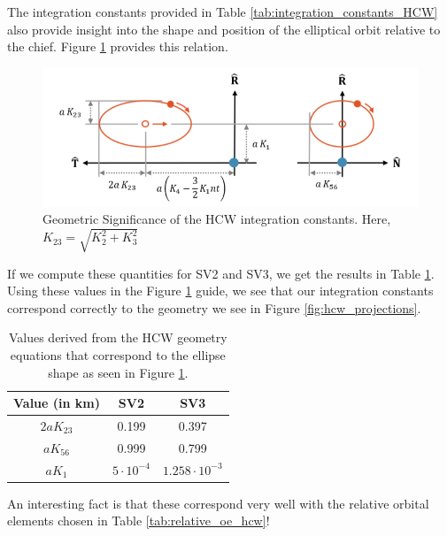 The integration constants provided in Table \ref{tab:integration_constants_HCW} also provide insight into the shape and position of the elliptical orbit relative to the chief. Figure \ref{fig:hcw_gemeotry} provides this relation. 

\begin{figure}[htpb]
    \centering
    \includegraphics[width=0.75\linewidth]{LaTeX//PS3/hcw_integration_constants.png}
    \caption{Geometric Significance of the HCW integration constants. Here, $K_{23} = \sqrt{K_2^2 + K_3^2}$ \cite{willis2023analytical}}
    \label{fig:hcw_gemeotry}
\end{figure}

If we compute these quantities for SV2 and SV3, we get the results in Table \ref{tab:HCW_geometry_values}. Using these values in the Figure \ref{fig:hcw_gemeotry} guide, we see that our integration constants correspond correctly to the geometry we see in Figure \ref{fig:hcw_projections}.

\begin{table}[ht]
    \centering
    \renewcommand{\arraystretch}{1.2}
    \begin{tabular}{c c c}
        \toprule
        \textbf{Value (in km)} & \textbf{SV2} & \textbf{SV3} \\
        \midrule
        $2aK_{23}$ & 0.199 & 0.397 \\
        $aK_{56}$ & 0.999 & 0.799 \\
        $aK_1$ & $5\cdot10^{-4}$& $1.258\cdot10^{-3}$\\
        \bottomrule
    \end{tabular}
    \caption{Values derived from the HCW geometry equations that correspond to the ellipse shape as seen in Figure \ref{fig:hcw_gemeotry}.}
    \label{tab:HCW_geometry_values}
\end{table}

An interesting fact is that these correspond very well with the relative orbital elements chosen in Table \ref{tab:relative_oe_hcw}!

